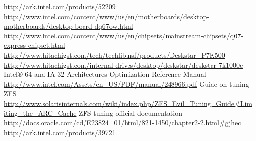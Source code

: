 {}
{}
\begin{thebibliography}{99}
 \url{http://ark.intel.com/products/52209}
 \url{http://www.intel.com/content/www/us/en/motherboards/desktop-motherboards/desktop-board-dq67ow.html}
 \url{http://www.intel.com/content/www/us/en/chipsets/mainstream-chipsets/q67-express-chipset.html}
 \url{http://www.hitachigst.com/tech/techlib.nsf/products/Deskstar_P7K500}
 \url{http://www.hitachigst.com/internal-drives/desktop/deskstar/deskstar-7k1000c}
 Intel® 64 and IA-32 Architectures Optimization Reference Manual \url{http://www.intel.com/Assets/en_US/PDF/manual/248966.pdf}
 Guide on tuning ZFS
\url{http://www.solarisinternals.com/wiki/index.php/ZFS\_Evil\_Tuning\_Guide#Limiting\_the\_ARC\_Cache}
 ZFS tuning official documentation
\url{http://docs.oracle.com/cd/E23824\_01/html/821-1450/chapter2-2.html#gjhec}
 \url{http://ark.intel.com/products/39721}
\end{thebibliography}
